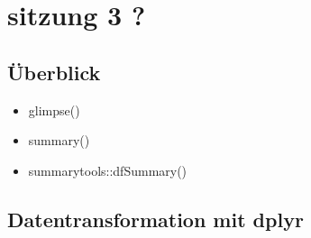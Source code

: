 \documentclass[
  custompaper,
  DIV=11,
  numbers=noendperiod]{scrartcl}
\begin{document}
\section{sitzung 3 ?}\label{sitzung-3}

\subsection{Überblick}\label{uxfcberblick}

\begin{itemize}
\item
  glimpse()
\item
  summary()
\item
  summarytools::dfSummary()
\end{itemize}

\subsection{Datentransformation mit
dplyr}\label{datentransformation-mit-dplyr}
\end{document}
